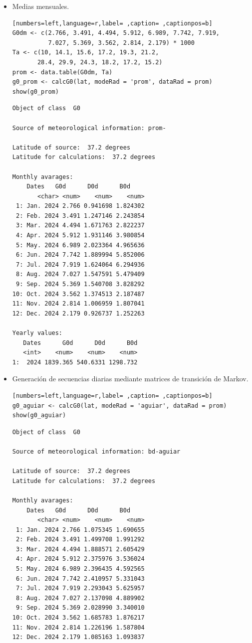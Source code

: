 \begin{itemize}
\item Medias mensuales.
\begin{lstlisting}[numbers=left,language=r,label= ,caption= ,captionpos=b]
G0dm <- c(2.766, 3.491, 4.494, 5.912, 6.989, 7.742, 7.919,
          7.027, 5.369, 3.562, 2.814, 2.179) * 1000
Ta <- c(10, 14.1, 15.6, 17.2, 19.3, 21.2,
       28.4, 29.9, 24.3, 18.2, 17.2, 15.2)
prom <- data.table(G0dm, Ta) 
g0_prom <- calcG0(lat, modeRad = 'prom', dataRad = prom)
show(g0_prom)
\end{lstlisting}

\begin{verbatim}
Object of class  G0 

Source of meteorological information: prom- 

Latitude of source:  37.2 degrees
Latitude for calculations:  37.2 degrees

Monthly avarages:
	Dates   G0d      D0d      B0d
       <char> <num>    <num>    <num>
 1: Jan. 2024 2.766 0.941698 1.824302
 2: Feb. 2024 3.491 1.247146 2.243854
 3: Mar. 2024 4.494 1.671763 2.822237
 4: Apr. 2024 5.912 1.931146 3.980854
 5: May. 2024 6.989 2.023364 4.965636
 6: Jun. 2024 7.742 1.889994 5.852006
 7: Jul. 2024 7.919 1.624064 6.294936
 8: Aug. 2024 7.027 1.547591 5.479409
 9: Sep. 2024 5.369 1.540708 3.828292
10: Oct. 2024 3.562 1.374513 2.187487
11: Nov. 2024 2.814 1.006959 1.807041
12: Dec. 2024 2.179 0.926737 1.252263

Yearly values:
   Dates      G0d      D0d      B0d
   <int>    <num>    <num>    <num>
1:  2024 1839.365 540.6331 1298.732
\end{verbatim}

\item Generación de secuencias diarias mediante matrices de transición de Markov.
\begin{lstlisting}[numbers=left,language=r,label= ,caption= ,captionpos=b]
g0_aguiar <- calcG0(lat, modeRad = 'aguiar', dataRad = prom)
show(g0_aguiar)
\end{lstlisting}

\begin{verbatim}
Object of class  G0 

Source of meteorological information: bd-aguiar 

Latitude of source:  37.2 degrees
Latitude for calculations:  37.2 degrees

Monthly avarages:
	Dates   G0d      D0d      B0d
       <char> <num>    <num>    <num>
 1: Jan. 2024 2.766 1.075345 1.690655
 2: Feb. 2024 3.491 1.499708 1.991292
 3: Mar. 2024 4.494 1.888571 2.605429
 4: Apr. 2024 5.912 2.375976 3.536024
 5: May. 2024 6.989 2.396435 4.592565
 6: Jun. 2024 7.742 2.410957 5.331043
 7: Jul. 2024 7.919 2.293043 5.625957
 8: Aug. 2024 7.027 2.137098 4.889902
 9: Sep. 2024 5.369 2.028990 3.340010
10: Oct. 2024 3.562 1.685783 1.876217
11: Nov. 2024 2.814 1.226196 1.587804
12: Dec. 2024 2.179 1.085163 1.093837


\end{verbatim}
\end{itemize}
